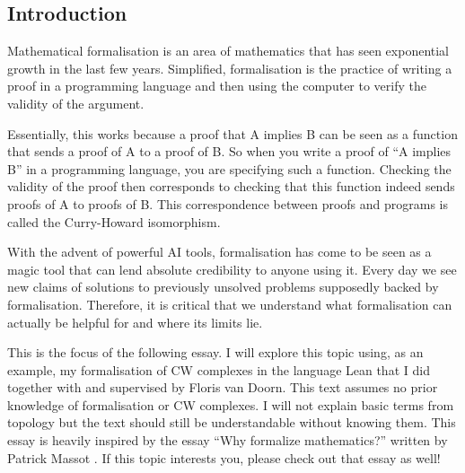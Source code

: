 



\subsection*{Introduction}

Mathematical formalisation is an area of mathematics that has seen exponential growth in the last few years. Simplified, formalisation is the practice of writing a proof in a programming language and then using the computer to verify the validity of the argument. 

Essentially, this works because a proof that A implies B can be seen as a function that sends a proof of A to a proof of B. So when you write a proof of ``A implies B'' in a programming language, you are specifying such a function. Checking the validity of the proof then corresponds to checking that this function indeed sends proofs of A to proofs of B. This correspondence between proofs and programs is called the Curry-Howard isomorphism.

With the advent of powerful AI tools, formalisation has come to be seen as a magic tool that can lend absolute credibility to anyone using it. Every day we see new claims of solutions to previously unsolved problems supposedly backed by formalisation. Therefore, it is critical that we understand what formalisation can actually be helpful for and where its limits lie. 

This is the focus of the following essay. I will explore this topic using, as an example, my formalisation of CW complexes in the language Lean that I did together with and supervised by Floris van Doorn. This text assumes no prior knowledge of formalisation or CW complexes. I will not explain basic terms from topology but the text should still be understandable without knowing them. This essay is heavily inspired by the essay ``Why formalize mathematics?'' written by Patrick Massot \cite{Massot2021WhyFM}. If this topic interests you, please check out that essay as well!

